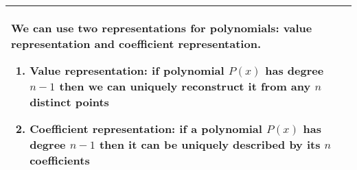 {\tabulinesep=1mm
\begin{tabu}{|p{16cm} |}
\hline
We can use two representations for polynomials: value representation and coefficient representation.
\begin{enumerate} 
    \item Value representation: if polynomial $P(x)$ has degree $n - 1$ then we can uniquely reconstruct it from any $n$ distinct points 
    \item Coefficient representation: if a polynomial $P(x)$ has degree $n - 1$ then it can be uniquely described by its $n$ coefficients 
\end{enumerate}\\
\hline
\end{tabu}
}
